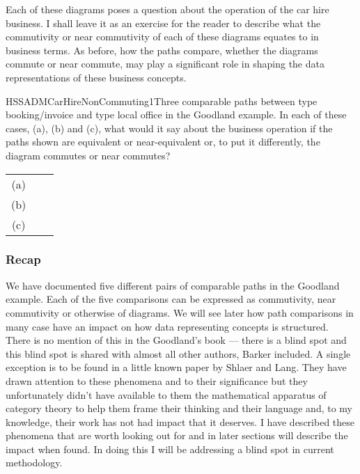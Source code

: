 Each of these diagrams poses a question about the operation of the car hire business.
I shall leave it as
an exercise for the reader to describe what the commutivity or near commutivity of each of these diagrams equates to in business terms.
As before, how the paths compare, whether the diagrams commute or near commute, may play a significant role in  shaping the data representations of these business concepts.

\begin{erboxedFigure}{H}{SSADMCarHireNonCommuting1}{Three comparable paths between type booking/invoice and type local office in the Goodland example. 
In each of these cases, (a), (b) and (c), what  would it say about the business operation if the paths 
shown are equivalent or near-equivalent or, to put it differently, the diagram commutes or near commutes?
}
\begin{tabular}{c p{1cm} c}
(a) &&  \\
(b) &&  \\
(c) && 
\end{tabular}
\end{erboxedFigure}

\subsubsection{Recap}
We have documented five different pairs of comparable paths in the Goodland example. 
Each of the five comparisons can be expressed as commutivity, near commutivity or otherwise of diagrams. 
We will see later how path comparisons in many case have an impact on how data representing concepts is structured. There is no mention of this in the Goodland's book --- there is a blind spot and this
blind spot is shared with almost all other authors, Barker included. 
A single exception is to be found  in a little known paper by Shlaer and Lang. 
They have drawn attention to these phenomena  and to their significance but they unfortunately didn't have 
 available to them the mathematical apparatus of category theory to help them frame their thinking and their language and, to my knowledge, their work has not had impact that it deserves. 
I have described these phenomena that are worth looking out for 
and in later sections will describe the impact  when found. 
In doing this I will be addressing a blind spot in current methodology.